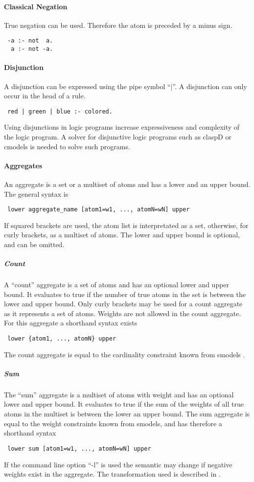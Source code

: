 \documentclass[a4paper,10pt]{article}
\begin{document}
\paragraph{Classical Negation}
True negation can be used. Therefore the atom is preceded by a minus sign.
\begin{verbatim}
 -a :- not  a.
  a :- not -a. 
\end{verbatim}
\paragraph{Disjunction}
A disjunction can be expressed using the pipe symbol ``$\mid$''.
A disjunction can only occur in the head of a rule.
\begin{verbatim}
 red | green | blue :- colored.
\end{verbatim}
Using disjunctions in logic programs increase expressiveness and complexity of the logic program.
A solver for disjunctive logic programs such as claspD \cite{claspD} or cmodels \cite{cmodels} is needed to solve such programs.

\paragraph{Aggregates}
An aggregate is a set or a multiset of atoms and has a lower and an upper bound.
The general syntax is
\begin{verbatim}
 lower aggregate_name [atom1=w1, ..., atomN=wN] upper
\end{verbatim}
If squared brackets are used, the atom list is interpretated as a set, otherwise, for curly brackets, as a multiset of atoms.
The lower and upper bound is optional, and can be omitted.

\subparagraph{Count}
A ``count'' aggregate is a set of atoms and has an optional lower and upper bound.
It evaluates to true if the number of true atoms in the set is between the lower and upper bound. Only curly brackets may be used for a count aggregate as it represents a set of atoms.
Weights are not allowed in the count aggregate.
For this aggregate a shorthand syntax exists
\begin{verbatim}
 lower {atom1, ..., atomN} upper
\end{verbatim}
The count aggregate is equal to the cardinality constraint known from smodels \cite{smodels}.
\subparagraph{Sum}
The ``sum'' aggregate is a multiset of atoms with weight and has an optional lower and upper bound. It evaluates to true if the sum of the weights of all true atoms in the multiset is between the lower an upper bound.
The sum aggregate is equal to the weight constraints known from smodels, and has therefore a shorthand syntax
\begin{verbatim}
 lower sum [atom1=w1, ..., atomN=wN] upper
\end{verbatim}
If the command line option ``-l'' is used the semantic may change if negative weights exist in the aggregate. The transformation used is described in \cite{lparseManual}.
\end{document}
